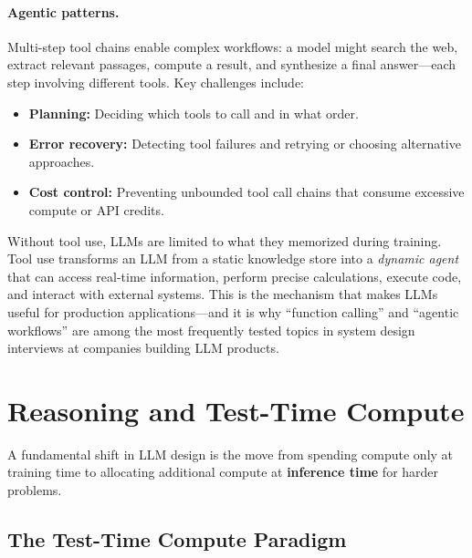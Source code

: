 \paragraph{Agentic patterns.}
Multi-step tool chains enable complex workflows: a model might search the
web, extract relevant passages, compute a result, and synthesize a final
answer---each step involving different tools.  Key challenges include:
\begin{itemize}[leftmargin=*]
\item \textbf{Planning:} Deciding which tools to call and in what order.
\item \textbf{Error recovery:} Detecting tool failures and retrying or
  choosing alternative approaches.
\item \textbf{Cost control:} Preventing unbounded tool call chains that
  consume excessive compute or API credits.
\end{itemize}

\begin{keyinsight}
Without tool use, LLMs are limited to what they memorized during training.
Tool use transforms an LLM from a static knowledge store into a
\emph{dynamic agent} that can access real-time information, perform precise
calculations, execute code, and interact with external systems.  This is the
mechanism that makes LLMs useful for production applications---and it is why
``function calling'' and ``agentic workflows'' are among the most frequently
tested topics in system design interviews at companies building LLM products.
\end{keyinsight}


\section{Reasoning and Test-Time Compute}
\label{sec:reasoning}

A fundamental shift in LLM design is the move from spending compute only at
training time to allocating additional compute at \textbf{inference time} for
harder problems.

\subsection{The Test-Time Compute Paradigm}

